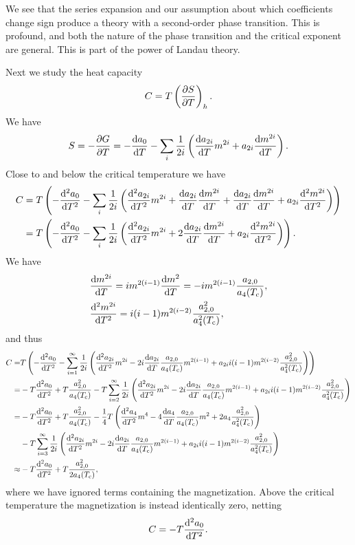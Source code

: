We see that the series expansion and our assumption about which coefficients change sign produce a theory with a second-order phase transition. This is profound, and both the nature of the phase transition and the critical exponent are general. This is part of the power of Landau theory.

Next we study the heat capacity
\begin{align*}
	C = T\left(\pdv{S}{T}\right)_{h}.
\end{align*}
We have
\begin{align*}
	S = -\pdv{G}{T} = -\dv{a_{0}}{T} - \sum\limits_{i}\frac{1}{2i}\left(\dv{a_{2i}}{T}m^{2i} + a_{2i}\dv{m^{2i}}{T}\right).
\end{align*}
Close to and below the critical temperature we have
\begin{align*}
	C &= T\left(-\dv[2]{a_{0}}{T} - \sum\limits_{i}\frac{1}{2i}\left(\dv[2]{a_{2i}}{T}m^{2i} + \dv{a_{2i}}{T}\dv{m^{2i}}{T} + \dv{a_{2i}}{T}\dv{m^{2i}}{T} + a_{2i}\dv[2]{m^{2i}}{T}\right)\right) \\
	  &= T\left(-\dv[2]{a_{0}}{T} - \sum\limits_{i}\frac{1}{2i}\left(\dv[2]{a_{2i}}{T}m^{2i} + 2\dv{a_{2i}}{T}\dv{m^{2i}}{T} + a_{2i}\dv[2]{m^{2i}}{T}\right)\right).
\end{align*}
We have
\begin{align*}
	&\dv{m^{2i}}{T} = im^{2(i - 1)}\dv{m^{2}}{T} = -im^{2(i - 1)}\frac{a_{2, 0}}{a_{4}(T_{\text{c}})}, \\
	&\dv[2]{m^{2i}}{T} = i(i - 1)m^{2(i - 2)}\frac{a_{2, 0}^{2}}{a_{4}^{2}(T_{\text{c}})},
\end{align*}
and thus
\begin{align*}
	C =& T\left(-\dv[2]{a_{0}}{T} - \sum\limits_{i = 1}^{\infty}\frac{1}{2i}\left(\dv[2]{a_{2i}}{T}m^{2i} - 2i\dv{a_{2i}}{T}\frac{a_{2, 0}}{a_{4}(T_{\text{c}})}m^{2(i - 1)} + a_{2i}i(i - 1)m^{2(i - 2)}\frac{a_{2, 0}^{2}}{a_{4}^{2}(T_{\text{c}})}\right)\right) \\
	  =& -T\dv[2]{a_{0}}{T} + T\frac{a_{2, 0}^{2}}{a_{4}(T_{\text{c}})} - T\sum\limits_{i = 2}^{\infty}\frac{1}{2i}\left(\dv[2]{a_{2i}}{T}m^{2i} - 2i\dv{a_{2i}}{T}\frac{a_{2, 0}}{a_{4}(T_{\text{c}})}m^{2(i - 1)} + a_{2i}i(i - 1)m^{2(i - 2)}\frac{a_{2, 0}^{2}}{a_{4}^{2}(T_{\text{c}})}\right) \\
	  =& -T\dv[2]{a_{0}}{T} + T\frac{a_{2, 0}^{2}}{a_{4}(T_{\text{c}})} - \frac{1}{4}T\left(\dv[2]{a_{4}}{T}m^{4} - 4\dv{a_{4}}{T}\frac{a_{2, 0}}{a_{4}(T_{\text{c}})}m^{2} + 2a_{4}\frac{a_{2, 0}^{2}}{a_{4}^{2}(T_{\text{c}})}\right) \\
	   &- T\sum\limits_{i = 3}^{\infty}\frac{1}{2i}\left(\dv[2]{a_{2i}}{T}m^{2i} - 2i\dv{a_{2i}}{T}\frac{a_{2, 0}}{a_{4}(T_{\text{c}})}m^{2(i - 1)} + a_{2i}i(i - 1)m^{2(i - 2)}\frac{a_{2, 0}^{2}}{a_{4}^{2}(T_{\text{c}})}\right) \\
	  \approx& -T\dv[2]{a_{0}}{T} + T\frac{a_{2, 0}^{2}}{2a_{4}(T_{\text{c}})},
\end{align*}
where we have ignored terms containing the magnetization. Above the critical temperature the magnetization is instead identically zero, netting
\begin{align*}
	C = -T\dv[2]{a_{0}}{T}.
\end{align*}

